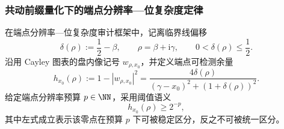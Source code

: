 \subsubsection{共动前缀量化下的端点分辨率—位复杂度定律}\label{subsubsec:xi-comoving-prefix-endpoint-budget-laws}
在端点分辨率—位复杂度审计框架中，记离临界线偏移
\[
\delta(\rho):=\frac12-\beta,\qquad
\rho=\beta+\mathrm{i}\gamma,\qquad
0<\delta(\rho)\le \frac12.
\]
沿用 Cayley 图表的盘内像记号 \(w_{\rho,x_0}\)，并定义端点可检测余量
\begin{equation}\label{eq:xi-comoving-prefix-endpoint-margin}
h_{x_0}(\rho)
:=
1-|w_{\rho,x_0}|^2
=
\frac{4\delta(\rho)}{(\gamma-x_0)^2+(1+\delta(\rho))^2}.
\end{equation}
给定端点分辨率预算 \(p\in\NN\)，采用阈值语义
\begin{equation}\label{eq:xi-comoving-prefix-detection-threshold}
h_{x_0}(\rho)\ge 2^{-p},
\end{equation}
其中左式成立表示该零点在预算 \(p\) 下可被稳定区分，反之不可被统一区分。

